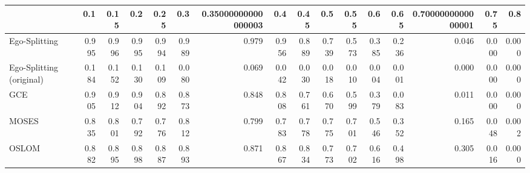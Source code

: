 \begin{tabular}{lrrrrrrrrrrrrrrr}
\toprule
{} &   0.1 &  0.15 &   0.2 &  0.25 &   0.3 & 0.35000000000000003 &   0.4 &  0.45 &   0.5 &  0.55 &   0.6 &  0.65 & 0.7000000000000001 &  0.75 &   0.8 \\
\midrule
Ego-Splitting            & 0.995 & 0.996 & 0.995 & 0.994 & 0.989 &               0.979 & 0.956 & 0.889 & 0.739 & 0.573 & 0.385 & 0.236 &              0.046 & 0.000 & 0.000 \\
Ego-Splitting (original) & 0.184 & 0.152 & 0.130 & 0.109 & 0.080 &               0.069 & 0.042 & 0.030 & 0.018 & 0.010 & 0.004 & 0.001 &              0.000 & 0.000 & 0.000 \\
GCE                      & 0.905 & 0.912 & 0.904 & 0.892 & 0.873 &               0.848 & 0.808 & 0.761 & 0.670 & 0.599 & 0.379 & 0.083 &              0.011 & 0.000 & 0.000 \\
MOSES                    & 0.835 & 0.801 & 0.792 & 0.776 & 0.812 &               0.799 & 0.783 & 0.778 & 0.775 & 0.701 & 0.546 & 0.352 &              0.165 & 0.048 & 0.002 \\
OSLOM                    & 0.882 & 0.895 & 0.898 & 0.887 & 0.893 &               0.871 & 0.867 & 0.834 & 0.773 & 0.702 & 0.616 & 0.498 &              0.305 & 0.016 & 0.000 \\
\bottomrule
\end{tabular}
